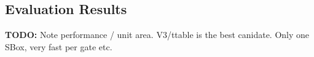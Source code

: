 
\subsection{Evaluation Results}
\label{sec:eval:results}

{\bf TODO:}
Note performance / unit area.
V3/ttable is the best canidate. Only one SBox, very fast per gate etc.
